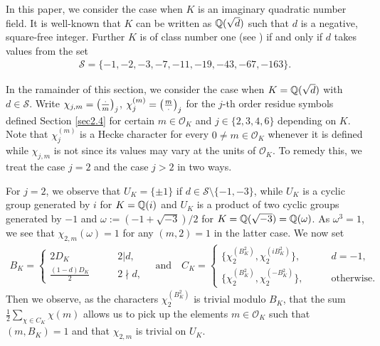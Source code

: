 \documentclass[twoside,leqno,10pt, A4]{amsart}
\begin{document}
  In this paper, we consider the case when $K$ is an imaginary quadratic number field. It is well-known that $K$ can be written as $\mathbb Q(\sqrt{d})$ such that $d$ is a negative, square-free integer.  Further $K$ is of class number one (see \cite[(22.77)]{iwakow}) if and only if $d$ takes values from the set
\begin{align} \label{dvalue}
\mathcal{S} = \{-1, -2, -3, -7,-11,-19,-43,-67,-163 \}.
\end{align}

In the ramainder of this section, we consider the case when $K=\mathbb Q(\sqrt{d})$ with $d \in \mathcal{S}$.  Write $\chi_{j, m} =\left(\frac{\cdot}{m}\right)_j$, $\chi^{(m)}_{j}=\left(\frac{m}{\cdot}\right)_j$ for the $j$-th order residue symbols defined Section \ref{sec2.4} for certain $m \in \mathcal O_K$ and $j \in \{2, 3, 4, 6\}$ depending on $K$.  Note that $\chi^{(m)}_{j}$ is a Hecke character for every $0 \neq m \in \mathcal O_K$ whenever it is defined while $\chi_{j,m}$ is not since its values may vary at the units of $\mathcal O_K$. To remedy this, we treat the case $j=2$ and the case $j>2$ in two ways. \newline

For $j=2$, we observe that $U_K=\{\pm 1\}$ if $d \in \mathcal{S} \setminus \{ -1, -3 \}$, while $U_K$ is a cyclic group generated by $i$ for $K=\mathbb Q(i)$ and $U_K$ is a product of two cyclic groups generated by
$-1$ and $\omega:=(-1+\sqrt{-3})/2$ for $K=\mathbb Q(\sqrt{-3})=\mathbb Q(\omega)$. As $\omega^3=1$, we see that $\chi_{2,m}(\omega)=1$ for any $(m,2)=1$ in the latter case. We now set
\begin{align} \label{BKCKdef}
 B_K   =\begin{cases}
    2D_K \qquad & 2|d, \\
    \frac {(1-d)D_K}{2} \qquad & 2\nmid d,
\end{cases}
\quad \mbox{and} \quad
 C_K =\begin{cases}
   \displaystyle \{\chi^{(B^2_K)}_2,  \chi^{(iB^2_K)}_2 \}, \qquad & d=-1, \\
   \displaystyle  \{\chi^{(B^2_K)}_2,  \chi^{(-B^2_K)}_2 \}, \qquad & \text{otherwise}.
\end{cases}
\end{align}
  Then we observe, as the characters $\chi^{(B^2_K)}_2$ is trivial modulo $B_K$, that the sum $\frac 12\sum_{\chi \in C_K}\chi(m)$ allows us to pick up the elements $m \in \mathcal O_K$ such that $(m, B_K)=1$ and that $\chi_{2,m}$ is trivial on $U_K$. \newline
\end{document}
